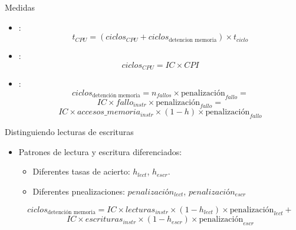 \begin{frame}[t]{Medidas}
\begin{itemize}
  \item {}:
\[
t_{CPU} = 
\left( ciclos_{CPU} + ciclos_{\text{detencion memoria}} \right) \times t_{ciclo}
\]

  \item {}:
\[
ciclos_{CPU} =
IC \times CPI
\]

  \item {}:
\[
ciclos_{\text{detención memoria}} =
n_{fallos} \times \text{penalización}_{fallo}=
\]
\[
IC \times fallo_{instr} \times \text{penalización}_{fallo} =
\]
\[
IC \times accesos\_memoria_{instr} \times (1 - h ) \times \text{penalización}_{fallo}
\]
\end{itemize}
\end{frame}

\begin{frame}[t]{Distinguiendo lecturas de escrituras}
\begin{itemize}
  \item Patrones de lectura y escritura diferenciados:
    \begin{itemize}
      \item Diferentes tasas de acierto: $h_{lect}$, $h_{escr}$.
      \item Diferentes pnealizaciones: $penalización_{lect}$, $penalización_{escr}$
    \end{itemize}

\[
ciclos_{\text{detención memoria}} =
IC \times lecturas_{instr} \times (1 - h_{lect}) \times \text{penalización}_{lect} +
\]
\[
IC \times escrituras_{instr} \times (1 - h_{escr}) \times \text{penalización}_{escr}
\]
\end{itemize}
\end{frame}
